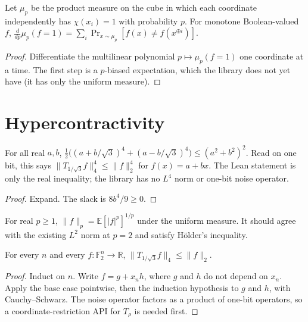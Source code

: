 \begin{theorem}
  \label{thm:analysis-margulis-russo}
  \notready
  Let $\mu_p$ be the product measure on the cube in which each coordinate
  independently has $\chi(x_i) = 1$ with probability $p$. For monotone
  Boolean-valued $f$,
  $\frac{d}{dp} \mu_p(f = 1) = \sum_i \Pr_{x \sim \mu_p}[f(x) \neq f(x^{\oplus i})]$.
\end{theorem}
\begin{proof}
  Differentiate the multilinear polynomial $p \mapsto \mu_p(f = 1)$ one coordinate
  at a time. The first step is a $p$-biased expectation, which the library does
  not yet have (it has only the uniform measure).
\end{proof}

\section{Hypercontractivity}

\begin{lemma}
  \label{lem:analysis-bonami-base}
  \leanok
  For all real $a, b$,
  $\frac{1}{2}\bigl((a + b/\sqrt{3})^4 + (a - b/\sqrt{3})^4\bigr) \le (a^2 + b^2)^2$.
  Read on one bit, this says
  $\lVert T_{1/\sqrt{3}} f \rVert_4^4 \le \lVert f \rVert_2^4$ for
  $f(x) = a + bx$. The Lean statement is only the real inequality; the library
  has no $L^4$ norm or one-bit noise operator.
\end{lemma}
\begin{proof}
  \leanok
  Expand. The slack is $8b^4/9 \ge 0$.
\end{proof}

\begin{definition}[$L^p$ norms]
  \label{def:analysis-lp-norm}
  For real $p \ge 1$, $\lVert f \rVert_p = \mathbb{E}[|f|^p]^{1/p}$ under the
  uniform measure. It should agree with the existing $L^2$ norm at $p = 2$ and
  satisfy H\"older's inequality.
\end{definition}

\begin{theorem}[$(2,4)$-hypercontractivity]
  \label{thm:analysis-hypercontractivity}
  \notready
  For every $n$ and every $f : \mathbb{F}_2^n \to \mathbb{R}$,
  $\lVert T_{1/\sqrt{3}} f \rVert_4 \le \lVert f \rVert_2$.
\end{theorem}
\begin{proof}
  Induct on $n$. Write $f = g + x_n h$, where $g$ and $h$ do not depend on
  $x_n$. Apply the base case pointwise, then the induction hypothesis to $g$ and
  $h$, with Cauchy--Schwarz. The noise operator factors as a product of one-bit
  operators, so a coordinate-restriction API for $T_\rho$ is needed first.
\end{proof}

